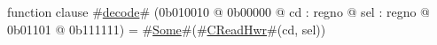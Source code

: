 function clause #\hyperref[zdecode]{decode}# (0b010010 @ 0b00000 @ cd : regno @ sel : regno @   0b01101 @ 0b111111) = #\hyperref[zSome]{Some}#(#\hyperref[zCReadHwr]{CReadHwr}#(cd, sel))
